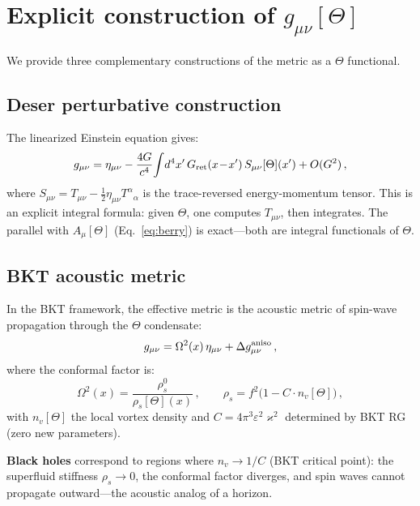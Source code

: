 \documentclass[twocolumn,preprintnumbers,amsmath,amssymb,prd]{revtex4-2}
\begin{document}
\section{Explicit construction of $g_{\mu\nu}[\Theta]$}
\label{sec:metric}

We provide three complementary constructions of the metric as a $\Theta$ functional.

\subsection{Deser perturbative construction}

The linearized Einstein equation gives:
\begin{equation}
g_{\mu\nu} = \eta_{\mu\nu} - \frac{4G}{c^4}\!\int\! d^4x'\,G_{\rm ret}(x\!-\!x')\,S_{\mu\nu}[\Theta](x') + O(G^2)\,,
\label{eq:deser}
\end{equation}
where $S_{\mu\nu} = T_{\mu\nu} - \frac{1}{2}\eta_{\mu\nu}T^\alpha{}_\alpha$ is the trace-reversed energy-momentum tensor.
This is an explicit integral formula: given $\Theta$, one computes $T_{\mu\nu}$, then integrates.
The parallel with $A_\mu[\Theta]$ (Eq.~\ref{eq:berry}) is exact---both are integral functionals of $\Theta$.

\subsection{BKT acoustic metric}

In the BKT framework, the effective metric is the acoustic metric of spin-wave propagation through the $\Theta$ condensate:
\begin{equation}
g_{\mu\nu} = \Omega^2(x)\,\eta_{\mu\nu} + \Delta g_{\mu\nu}^{\rm aniso}\,,
\label{eq:acoustic}
\end{equation}
where the conformal factor is:
\begin{equation}
\Omega^2(x) = \frac{\rho_s^0}{\rho_s[\Theta](x)}\,, \qquad
\rho_s = f^2\bigl(1 - C\cdot n_v[\Theta]\bigr)\,,
\end{equation}
with $n_v[\Theta]$ the local vortex density and $C = 4\pi^3\varepsilon^2\varkappa^2$ determined by BKT RG (zero new parameters).

\textbf{Black holes} correspond to regions where $n_v \to 1/C$ (BKT critical point): the superfluid stiffness $\rho_s \to 0$, the conformal factor diverges, and spin waves cannot propagate outward---the acoustic analog of a horizon.
\end{document}
